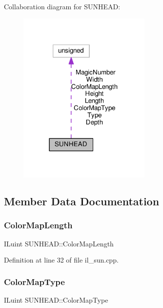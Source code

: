 Collaboration diagram for S\+U\+N\+H\+E\+AD\+:
\nopagebreak
\begin{figure}[H]
\begin{center}
\leavevmode
\includegraphics[width=186pt]{df/dc7/structSUNHEAD__coll__graph}
\end{center}
\end{figure}


\subsection{Member Data Documentation}
\mbox{\label{structSUNHEAD_a8853eb5dc6f80653211b0f13a5816a0d}} 
\subsubsection{\texorpdfstring{Color\+Map\+Length}{ColorMapLength}}
{\footnotesize\ttfamily I\+Luint S\+U\+N\+H\+E\+A\+D\+::\+Color\+Map\+Length}



Definition at line 32 of file il\+\_\+sun.\+cpp.

\mbox{\label{structSUNHEAD_a12b59b9c5eb1e88e34561b9b92166c4c}} 
\subsubsection{\texorpdfstring{Color\+Map\+Type}{ColorMapType}}
{\footnotesize\ttfamily I\+Luint S\+U\+N\+H\+E\+A\+D\+::\+Color\+Map\+Type}



